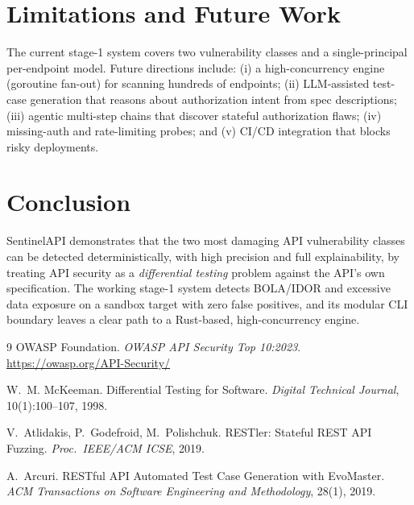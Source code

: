 \documentclass[11pt]{article}
\begin{document}
\section{Limitations and Future Work}
The current stage-1 system covers two vulnerability classes and a single-principal
per-endpoint model. Future directions include: (i) a high-concurrency engine (goroutine fan-out) for
scanning hundreds of endpoints; (ii) LLM-assisted test-case generation that reasons
about authorization intent from spec descriptions; (iii) agentic multi-step chains that
discover stateful authorization flaws; (iv) missing-auth and rate-limiting probes; and
(v) CI/CD integration that blocks risky deployments.

\section{Conclusion}
SentinelAPI demonstrates that the two most damaging API vulnerability classes can be
detected deterministically, with high precision and full explainability, by treating API
security as a \emph{differential testing} problem against the API's own specification. The
working stage-1 system detects BOLA/IDOR and excessive data exposure on a sandbox target
with zero false positives, and its modular CLI boundary leaves a clear path to a
Rust-based, high-concurrency engine.

\begin{thebibliography}{9}
OWASP Foundation. \emph{OWASP API Security Top 10:2023}. \\
\url{https://owasp.org/API-Security/}

W.~M. McKeeman. Differential Testing for Software. \emph{Digital Technical Journal},
10(1):100--107, 1998.

V.~Atlidakis, P.~Godefroid, M.~Polishchuk. RESTler: Stateful REST API Fuzzing.
\emph{Proc.\ IEEE/ACM ICSE}, 2019.

A.~Arcuri. RESTful API Automated Test Case Generation with EvoMaster.
\emph{ACM Transactions on Software Engineering and Methodology}, 28(1), 2019.
\end{thebibliography}
\end{document}
